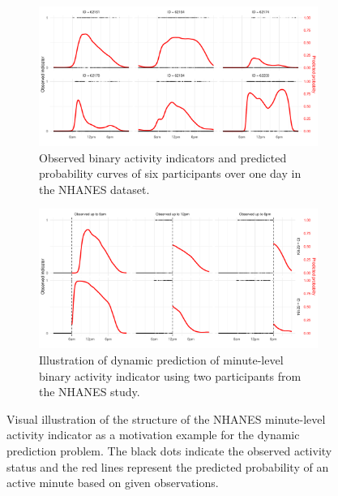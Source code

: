 \documentclass[12pt]{article}
\begin{document}
\begin{figure}
\centering

\begin{subfigure}{0.9\textwidth}
\includegraphics[width=\textwidth]{Figs/MotiveExp_a.pdf}
\caption{Observed binary activity indicators and predicted probability curves of six participants over one day in the NHANES dataset.}   
\label{fig:nhanes_data}
\end{subfigure}

\begin{subfigure}{0.9\textwidth}
\includegraphics[width=\textwidth]{Figs/MotiveExp_b.pdf}
\caption{Illustration of dynamic prediction of minute-level binary activity indicator using two participants from the NHANES study.}
\label{fig:nhanes_dynpred}   
\end{subfigure}

    
\caption{Visual illustration of the structure of the NHANES minute-level activity indicator as a motivation example for the dynamic prediction problem. The black dots indicate the observed activity status and the red lines represent the predicted probability of an active minute based on given observations.}
\label{fig:MotiveExp}
\end{figure}
\end{document}
